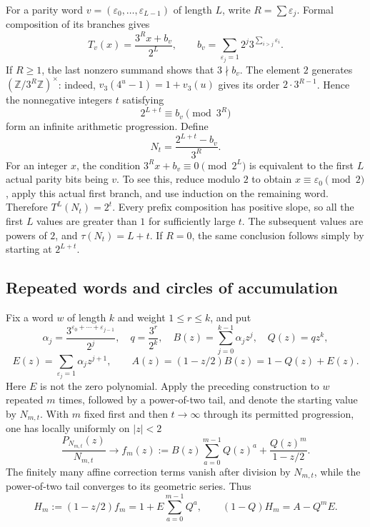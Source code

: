 \documentclass[11pt,a4paper]{article}
\theoremstyle{definition}
\theoremstyle{remark}
\numberwithin{equation}{section}
\begin{document}
For a parity word $v=(\varepsilon_0,\ldots,\varepsilon_{L-1})$ of length
$L$, write $R=\sum\varepsilon_j$. Formal composition of its branches gives
\begin{equation}
 T_v(x)=\frac{3^R x+b_v}{2^L},\qquad
 b_v=\sum_{\varepsilon_j=1}2^j3^{\sum_{i>j}\varepsilon_i}.
 \label{A:eq:ucz-word}
\end{equation}
If $R\geq1$, the last nonzero summand shows that $3\nmid b_v$.
The element $2$ generates $(\mathbb Z/3^R\mathbb Z)^\times$: indeed,
$v_3(4^u-1)=1+v_3(u)$ gives its order $2\cdot3^{R-1}$.
Hence the nonnegative integers $t$ satisfying
\[
 2^{L+t}\equiv b_v\pmod{3^R}
\]
form an infinite arithmetic progression. Define
\[
 N_t=\frac{2^{L+t}-b_v}{3^R}.
\]
For an integer $x$, the condition $3^R x+b_v\equiv0\pmod{2^L}$
is equivalent to the first $L$ actual parity bits being $v$.
To see this, reduce modulo $2$ to obtain
$x\equiv\varepsilon_0\pmod2$, apply this actual first branch, and use
induction on the remaining word. Therefore $T^L(N_t)=2^t$.
Every prefix composition has positive slope, so all the first $L$ values
are greater than $1$ for sufficiently large $t$. The subsequent values
are powers of $2$, and $\tau(N_t)=L+t$.
If $R=0$, the same conclusion follows simply by starting at $2^{L+t}$.

\subsection{Repeated words and circles of accumulation}

Fix a word $w$ of length $k$ and weight $1\leq r\leq k$, and put
\[
 \alpha_j=\frac{3^{\varepsilon_0+\cdots+\varepsilon_{j-1}}}{2^j},
 \quad q=\frac{3^r}{2^k},\quad
 B(z)=\sum_{j=0}^{k-1}\alpha_jz^j,\quad Q(z)=qz^k,
\]
\[
 E(z)=\sum_{\varepsilon_j=1}\alpha_jz^{j+1},\qquad
 A(z)=(1-z/2)B(z)=1-Q(z)+E(z).
\]
Here $E$ is not the zero polynomial. Apply the preceding construction to
$w$ repeated $m$ times, followed by a power-of-two tail, and denote the
starting value by $N_{m,t}$. With $m$ fixed first and then $t\to\infty$
through its permitted progression, one has locally uniformly on $|z|<2$
\begin{equation}
 \frac{P_{N_{m,t}}(z)}{N_{m,t}}
 \longrightarrow
 f_m(z):=B(z)\sum_{a=0}^{m-1}Q(z)^a+
 \frac{Q(z)^m}{1-z/2}.
 \label{A:eq:ucz-limit}
\end{equation}
The finitely many affine correction terms vanish after division by
$N_{m,t}$, while the power-of-two tail converges to its geometric series.
Thus
\[
 H_m:=(1-z/2)f_m=1+E\sum_{a=0}^{m-1}Q^a,
 \qquad (1-Q)H_m=A-Q^mE.
\]
\end{document}
